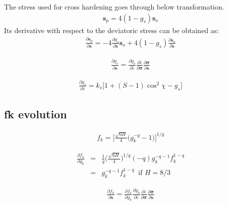 \documentclass[12pt]{amsart}
\begin{document}
The stress used for cross hardening goes through below transformation.
\begin{eqnarray}
  \label{eq:cross_linear1}
  \mathbf{s}_p = 4(1-g_s)\mathbf{s}_o
\end{eqnarray}
Its derivative with respect to the deviatoric stress can be obtained as:
\begin{eqnarray}
  \label{eq:cross_linear2}
\frac{\partial\mathbf{s}_p}{\partial\mathbf{s}} = -4 \frac{\partial g_s}{\partial\mathbf{s}} \mathbf{s}_o + 4(1-g_s) \frac{\partial\mathbf{s}_o}{\partial\mathbf{s}}
\end{eqnarray}



\begin{eqnarray}
  \label{eq:cross_linear3}
\frac{\partial g_s}{\partial\mathbf{s}}=\frac{\partial g_s}{\partial \bar{\varepsilon}} \frac{\partial\bar{\varepsilon}}{\partial\mathbf{\sigma}} \frac{\partial\mathbf{\sigma}}{\partial\mathbf{s}}
\end{eqnarray}


\begin{eqnarray}
  \label{eq:cross_linear4}
\frac{\partial g_s}{\partial \bar{\varepsilon}} = k_s\big[ 1+ (S-1)\cos^2\chi - g_s\big]
\end{eqnarray}


\subsection{fk evolution}

\begin{eqnarray}
  \label{eq:fk1}
  f_k = \bigg[ \frac{\sqrt{6H}}{4}   \Big(  g_k^{-q} - 1  \Big)  \bigg] ^{1/q}
\end{eqnarray}


\begin{eqnarray}
  \label{eq:fk2}
  \frac{\partial f_k}{\partial{g_k}} &=& \frac{1}{q}   \bigg(\frac{\sqrt{6H}}{4} \bigg)^{1/q}  (-q) g_k^{-q-1}    f_k^{1-q}\\
                                     &=&g_k^{-q-1} f_k^{1-q}  \ \text{  if } H=8/3
\end{eqnarray}

\begin{eqnarray}
  \label{eq:fk3}
  \frac{\partial f_k}{\partial \mathbf{s}} = \frac{\partial f_k}{\partial g_k} \frac{\partial g_k}{\partial\bar{\varepsilon}} \frac{\partial\bar{\varepsilon}}{\partial\mathbf{\sigma}}  \frac{\partial\mathbf{\sigma}}{\partial{\mathbf{s}}}
\end{eqnarray}
\end{document}
